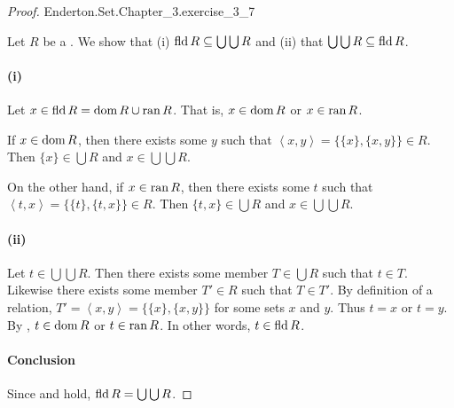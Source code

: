\documentclass{report}
\begin{document}
\begin{proof}

    {Enderton.Set.Chapter\_3.exercise\_3\_7}

  Let $R$ be a .
  We show that (i) $\mathop{\text{fld}}{R} \subseteq \bigcup\bigcup R$ and (ii) that
    $\bigcup\bigcup R \subseteq \mathop{\text{fld}}{R}$.

  \paragraph{(i)}%
  \label{par:exercise-3.7-i}

    Let $x \in \mathop{\text{fld}}{R} = \mathop{\text{dom}}{R} \cup \mathop{\text{ran}}{R}$.
    That is, $x \in \mathop{\text{dom}}{R}$ or $x \in \mathop{\text{ran}}{R}$.

    If $x \in \mathop{\text{dom}}{R}$, then there exists some $y$ such that
      $\left< x, y \right> = \{\{x\}, \{x, y\}\} \in R$.
    Then $\{x\} \in \bigcup R$ and $x \in \bigcup\bigcup R$.

    On the other hand, if $x \in \mathop{\text{ran}}{R}$, then there exists some $t$ such that
      $\left< t, x \right> = \{\{t\}, \{t, x\}\} \in R$.
    Then $\{t, x\} \in \bigcup R$ and $x \in \bigcup\bigcup R$.

  \paragraph{(ii)}%
  \label{par:exercise-3.7-ii}

    Let $t \in \bigcup\bigcup R$.
    Then there exists some member $T \in \bigcup R$ such that $t \in T$.
    Likewise there exists some member $T' \in R$ such that $T \in T'$.
    By definition of a relation,
      $T' = \left< x, y \right> = \{\{x\}, \{x, y\}\}$ for some sets $x$ and
      $y$.
    Thus $t = x$ or $t = y$.
    By , $t \in \mathop{\text{dom}}{R}$ or $t \in \mathop{\text{ran}}{R}$.
    In other words, $t \in \mathop{\text{fld}}{R}$.

  \paragraph{Conclusion}%

    Since  and  hold,
      $\mathop{\text{fld}}{R} = \bigcup\bigcup{R}$.

\end{proof}

\subsection{}%
\label{sub:exercise-3.8}
\end{document}
